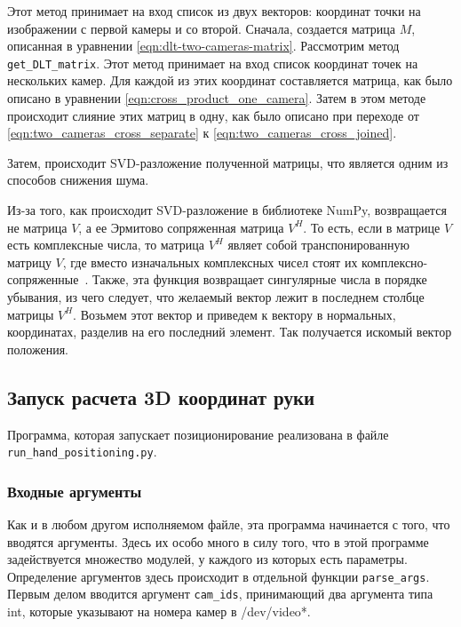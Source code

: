 \documentclass[12pt, a4paper]{article}
\begin{document}
Этот метод принимает на вход список из двух векторов: координат точки на
изображении с первой камеры и со второй.
Сначала, создается матрица $M$, описанная в уравнении
\eqref{eqn:dlt-two-cameras-matrix}. 
Рассмотрим метод \texttt{get\_DLT\_matrix}. Этот метод принимает на вход список
координат точек на нескольких камер. Для каждой из этих координат составляется
матрица, как было описано в уравнении \eqref{eqn:cross_product_one_camera}.
Затем в этом методе происходит слияние этих матриц в одну, как было описано при
переходе от \eqref{eqn:two_cameras_cross_separate} к
\eqref{eqn:two_cameras_cross_joined}.

Затем, происходит SVD-разложение полученной матрицы, что является одним из
способов снижения шума.

Из-за того, как происходит SVD-разложение в библиотеке NumPy, возвращается не
матрица $V$, а ее Эрмитово сопряженная матрица $V^H$. То есть, если в матрице
$V$ есть комплексные числа, то матрица $V^H$ являет собой транспонированную
матрицу $V$, где вместо изначальных комплексных чисел стоят их
комплексно-сопряженные~\cite{numpy_svd}. Также, эта функция возвращает
сингулярные числа в порядке убывания, из чего следует, что желаемый вектор
лежит в последнем столбце матрицы $V^H$. Возьмем этот вектор и приведем к вектору в
нормальных, координатах, разделив на его последний элемент. Так получается
искомый вектор положения.

\subsection{Запуск расчета 3D координат руки}
Программа, которая запускает позиционирование реализована в файле\\
\texttt{run\_hand\_positioning.py}.

\subsubsection{Входные аргументы}
Как и в любом другом исполняемом файле, эта программа начинается с того, что
вводятся аргументы. Здесь их особо много в силу того, что в этой программе
задействуется множество модулей, у каждого из которых есть параметры.
Определение аргументов здесь происходит в отдельной функции
\texttt{parse\_args}.
Первым делом вводится аргумент \texttt{cam\_ids}, принимающий два аргумента
типа int, которые указывают на номера камер в /dev/video*.
\end{document}
